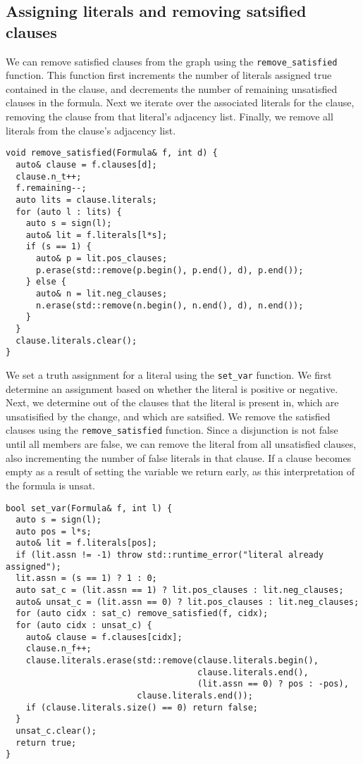 \documentclass[10pt,AMS Euler]{article}
\begin{document}
\subsection*{Assigning literals and removing satsified clauses}
\label{sec:org6d81e89}
We can remove satisfied clauses from the graph using the \texttt{remove\_satisfied}
function. This function first increments the number of literals assigned true
contained in the clause, and decrements the number of remaining unsatisfied
clauses in the formula. Next we iterate over the associated literals for the clause,
removing the clause from that literal's adjacency list. Finally, we remove all literals
from the clause's adjacency list.
\begin{verbatim}
void remove_satisfied(Formula& f, int d) {
  auto& clause = f.clauses[d];
  clause.n_t++;
  f.remaining--;
  auto lits = clause.literals;
  for (auto l : lits) {
    auto s = sign(l);
    auto& lit = f.literals[l*s];
    if (s == 1) {
      auto& p = lit.pos_clauses;
      p.erase(std::remove(p.begin(), p.end(), d), p.end());
    } else {
      auto& n = lit.neg_clauses;
      n.erase(std::remove(n.begin(), n.end(), d), n.end());
    }
  }
  clause.literals.clear();
}
\end{verbatim}
We set a truth assignment for a literal using the \texttt{set\_var} function.
We first determine an assignment based on whether the literal is positive or negative.
Next, we determine out of the clauses that the literal is present in, which are unsatisified
by the change, and which are satsified. We remove the satisfied clauses using the
\texttt{remove\_satisfied} function. Since a disjunction is not false until all members are false,
we can remove the literal from all unsatisfied clauses, also incrementing the number
of false literals in that clause. If a clause becomes empty as a result of setting the
variable we return early, as this interpretation of the formula is unsat.
\begin{verbatim}
bool set_var(Formula& f, int l) {
  auto s = sign(l);
  auto pos = l*s;
  auto& lit = f.literals[pos];
  if (lit.assn != -1) throw std::runtime_error("literal already assigned");
  lit.assn = (s == 1) ? 1 : 0;
  auto sat_c = (lit.assn == 1) ? lit.pos_clauses : lit.neg_clauses;
  auto& unsat_c = (lit.assn == 0) ? lit.pos_clauses : lit.neg_clauses;
  for (auto cidx : sat_c) remove_satisfied(f, cidx);
  for (auto cidx : unsat_c) {
    auto& clause = f.clauses[cidx];
    clause.n_f++;
    clause.literals.erase(std::remove(clause.literals.begin(),
                                      clause.literals.end(),
                                      (lit.assn == 0) ? pos : -pos),
                          clause.literals.end());
    if (clause.literals.size() == 0) return false;
  }
  unsat_c.clear();
  return true;
}
\end{verbatim}
\end{document}
